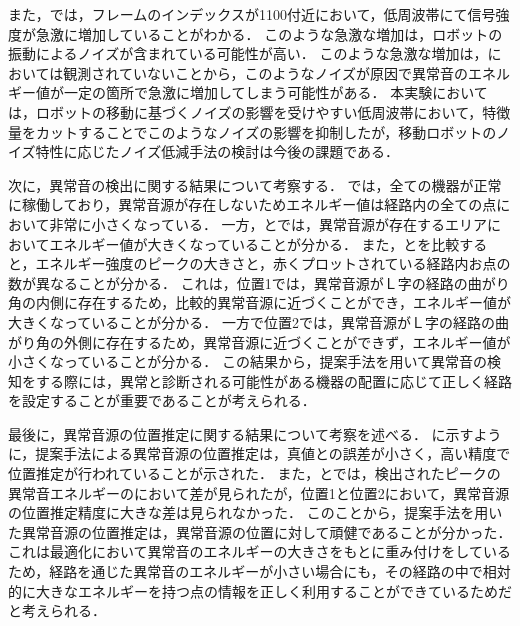 \documentclass[../main]{subfiles}
\begin{document}
また，では，フレームのインデックスが1100付近において，低周波帯にて信号強度が急激に増加していることがわかる．
このような急激な増加は，ロボットの振動によるノイズが含まれている可能性が高い．
このような急激な増加は，においては観測されていないことから，このようなノイズが原因で異常音のエネルギー値が一定の箇所で急激に増加してしまう可能性がある．
本実験においては，ロボットの移動に基づくノイズの影響を受けやすい低周波帯において，特徴量をカットすることでこのようなノイズの影響を抑制したが，移動ロボットのノイズ特性に応じたノイズ低減手法の検討は今後の課題である．

次に，異常音の検出に関する結果について考察する．
では，全ての機器が正常に稼働しており，異常音源が存在しないためエネルギー値は経路内の全ての点において非常に小さくなっている．
一方，とでは，異常音源が存在するエリアにおいてエネルギー値が大きくなっていることが分かる．
また，とを比較すると，エネルギー強度のピークの大きさと，赤くプロットされている経路内お点の数が異なることが分かる．
これは，位置1では，異常音源がＬ字の経路の曲がり角の内側に存在するため，比較的異常音源に近づくことができ，エネルギー値が大きくなっていることが分かる．
一方で位置2では，異常音源がＬ字の経路の曲がり角の外側に存在するため，異常音源に近づくことができず，エネルギー値が小さくなっていることが分かる．
この結果から，提案手法を用いて異常音の検知をする際には，異常と診断される可能性がある機器の配置に応じて正しく経路を設定することが重要であることが考えられる．


最後に，異常音源の位置推定に関する結果について考察を述べる．
に示すように，提案手法による異常音源の位置推定は，真値との誤差が小さく，高い精度で位置推定が行われていることが示された．
また，とでは，検出されたピークの異常音エネルギーのにおいて差が見られたが，位置1と位置2において，異常音源の位置推定精度に大きな差は見られなかった．
このことから，提案手法を用いた異常音源の位置推定は，異常音源の位置に対して頑健であることが分かった．これは最適化において異常音のエネルギーの大きさをもとに重み付けをしているため，経路を通じた異常音のエネルギーが小さい場合にも，その経路の中で相対的に大きなエネルギーを持つ点の情報を正しく利用することができているためだと考えられる．
\end{document}
